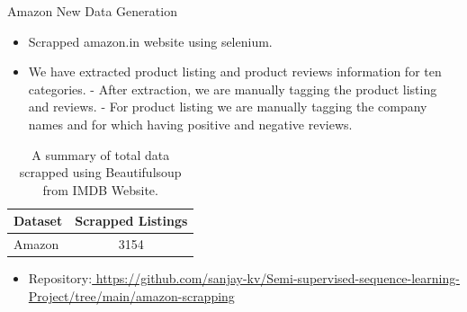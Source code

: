 \documentclass[aspectratio=169,xcolor=dvipsnames]{beamer}
\begin{document}
\begin{frame}{Amazon New Data Generation}
    \begin{itemize}
        \item Scrapped amazon.in website using selenium.
        \item We have extracted product listing and product reviews information for ten categories. \break 
            - After extraction, we are manually tagging the product listing and reviews. \break
            - For product listing we are manually tagging the company names and for which having positive and negative reviews.
            
    \end{itemize}
    
    
          \begin{table}[h!]
  \begin{center}
    \caption{A summary of total data scrapped using Beautifulsoup from IMDB Website.}
    \label{tab:table1}
    \begin{tabular}{l|c} %
      \hline
      \textbf{Dataset } & \textbf{Scrapped Listings} \\
      
      \hline
      Amazon & 3154  \\
      \hline
     
    \end{tabular}
  \end{center}
\end{table}
\begin{itemize}
      
    \item \alert{Repository:}\href{ https://github.com/sanjay-kv/Semi-supervised-sequence-learning-Project/tree/main/amazon_scrapping}{ https://github.com/sanjay-kv/Semi-supervised-sequence-learning-Project/tree/main/amazon-scrapping}
 
    \end{itemize}
\end{frame}


\end{document}
